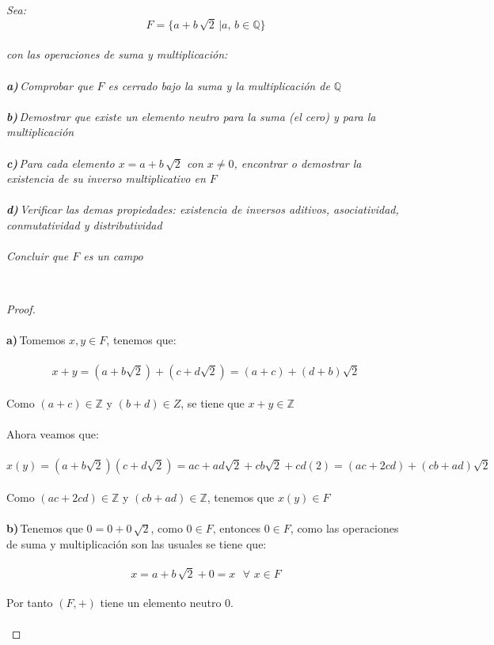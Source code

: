\documentclass[11pt,letterpaper]{article}
\newcommand{\Z}{\mathbb{Z}}
\begin{document}
\begin{tcolorbox}[
	title = \textcolor{black}{\textcolor{white}{Problema 3}},]
\textit{Sea:\,\\
\begin{equation*}
    F=\{a+b\,\sqrt{2}\,|a,\,b\in \mathbb{Q}\}
\end{equation*}\,\\
con las operaciones de suma y multiplicaci\'on:\,\\
\,\\
\textbf{a)}\,Comprobar que $F$ es cerrado bajo la suma y la multiplicaci\'on de $\mathbb{Q}$\,\\
\,\\
\textbf{b)}\,Demostrar que existe un elemento neutro para la suma (el cero) y para la multiplicaci\'on\,\\
\,\\
\textbf{c)}\,Para cada elemento $x=a+b\,\sqrt{2}$ con $x\neq 0$, encontrar o demostrar la existencia de su inverso multiplicativo
en $F$\,\\
\,\\
\textbf{d)}\,Verificar las demas propiedades: existencia de inversos aditivos, asociatividad, conmutatividad y distributividad\,\\
\,\\
Concluir que $F$ es un campo
}
\end{tcolorbox}\,\\
\begin{proof}\,\\
	\,\\
	\textbf{a)}\,Tomemos $x,y\in F$, tenemos que:\,\\
	\,\\
	\begin{equation*}
		x+y=(a+b\sqrt{2})+(c+d\sqrt{2})=(a+c)+(d+b)\sqrt{2}
	\end{equation*}\,\\
	Como $(a+c)\in \Z$ y $(b+d)\in Z$, se tiene que $x+y\in \Z$\,\\
	\,\\
	Ahora veamos que:\,\\
	\,\\
	\begin{equation*}
		x(y)=(a+b\sqrt{2})(c+d\sqrt{2})=ac+ad\sqrt{2}+cb\sqrt{2}+cd(2)=(ac+2cd)+(cb+ad)\sqrt{2}
	\end{equation*}\,\\
	Como $(ac+2cd)\in \Z$ y $(cb+ad)\in \Z$, tenemos que $x(y)\in F$\,\\
	\,\\
	\textbf{b)}\,Tenemos que $0=0+0\,\sqrt{2}$, como $0\in F$, entonces $0\in F$, como las operaciones de suma y multiplicaci\'on son
	las usuales se tiene que:\,\\
	\,\\
	\begin{equation*}
		x=a+b\,\sqrt{2}+0=x\,\,\,\,\forall\,\,x\in F
	\end{equation*}\,\\
	Por tanto $(F,+)$ tiene un elemento neutro $0$.\,\\
	\,\\
	
\end{proof}\,\\
\end{document}
